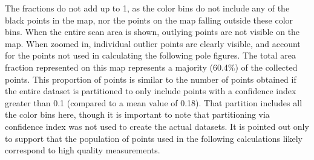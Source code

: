 %	
%		
%
%
%	
%		
%		
%		
%		
%		
%
The fractions do not add up to 1, as the color bins do not include any of the black points
in the map, nor the points on the map falling outside these color bins. When the entire
scan area is shown, outlying points are not visible on the map. When zoomed in, individual
outlier points are clearly visible, and account for the points not used in calculating the
following pole figures. The total area fraction represented on this map represents a 
majority (60.4\%) of the collected points. This proportion of points is similar to the number of
points obtained if the entire dataset is partitioned to only include points with a confidence
index greater than 0.1 (compared to a mean value of 0.18). That partition includes all the color
bins here, though it is important to note that partitioning via confidence index was not
used to create the actual datasets. It is pointed out only to support that the population of
points used in the following calculations likely correspond to high quality measurements.



